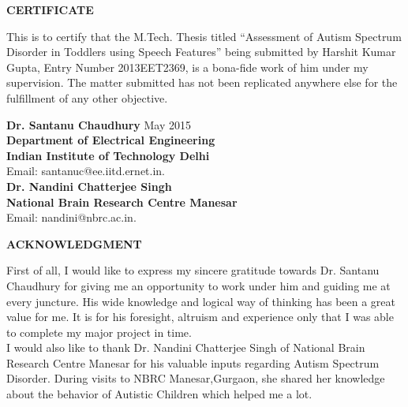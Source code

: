 \documentclass[11pt]{report}
\begin{document}
\setlength{\parindent}{4em}


\begin{center}
\textbf{CERTIFICATE}\\[.5cm]
 \end{center}


This is to certify that the M.Tech. Thesis titled ``Assessment of Autism Spectrum Disorder in Toddlers using Speech Features'' being submitted by Harshit Kumar Gupta, Entry Number 2013EET2369, is a bona-fide work of him under my supervision. The matter submitted has not been replicated anywhere else for the fulfillment of any other objective.

\vspace*{5cm}

\noindent
\textbf{Dr. Santanu Chaudhury}
{\hspace{9cm}May 2015}\\
\textbf{Department of Electrical Engineering}\\
\textbf{Indian Institute of Technology Delhi}\\
Email: santanuc@ee.iitd.ernet.in.\\


\vspace{2cm}
\noindent
\textbf{Dr. Nandini Chatterjee Singh}\\
\textbf{National Brain Research Centre Manesar}\\
Email: nandini@nbrc.ac.in.


\newpage
\begin{center}
\textbf{ACKNOWLEDGMENT}\\
 \end{center}


\medskip 

First of all, I would like to express my sincere gratitude towards Dr. Santanu Chaudhury for giving me an opportunity to work under him and guiding me at every juncture. His wide knowledge and logical way of thinking has been a great value for me. It is for his foresight, altruism and experience only that I was able to complete my major project in time.\\

I would also like to thank Dr. Nandini Chatterjee Singh of National Brain Research Centre Manesar for his valuable inputs regarding Autism Spectrum Disorder. During  visits to NBRC Manesar,Gurgaon, she shared her knowledge about the behavior of Autistic Children which helped me a lot.\\
\end{document}
